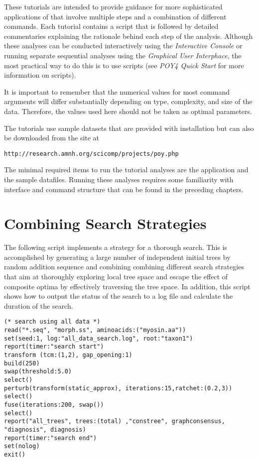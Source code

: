 These tutorials are intended to provide guidance for more sophisticated applications of \poy that involve multiple steps and a combination of different commands. Each tutorial contains a \poy script that is followed by detailed commentaries explaining the rationale behind each step of the analysis. Although these analyses can be conducted interactively using the \emph{Interactive Console} or running separate sequential analyses using the \emph{Graphical User Interphace}, the most practical way to do this is to use \poy scripts (see \emph{ POY4 Quick Start} for more information on \poy scripts).

It is important to remember that the numerical values for most command arguments will differ substantially depending on type, complexity, and size of the data. Therefore, the values used here should not be taken as optimal parameters.

The tutorials use sample datasets that are provided with \poy installation but can also be downloaded from the \poy site at
\begin{center}
\texttt{http://research.amnh.org/scicomp/projects/poy.php}
\end{center}
The minimal required items to run the tutorial analyses are the \poy application and the sample datafiles. Running these analyses requires some familiarity with \poy interface and command structure that can be found in the preceding chapters.

\section{Combining  Search Strategies}{\label{tutorial1}}
The following script implements a strategy for a thorough search. This is accomplished by generating a large number of independent initial trees by random addition sequence and combining combining different search strategies that aim at thoroughly exploring local tree space and escape the effect of composite optima by effectively traversing the tree space. In addition, this script shows how to output the status of the search to a log file and calculate the duration of the search. 

\begin{verbatim}
(* search using all data *)
read("*.seq", "morph.ss", aminoacids:("myosin.aa"))
set(seed:1, log:"all_data_search.log", root:"taxon1")
report(timer:"search start")
transform (tcm:(1,2), gap_opening:1)
build(250)
swap(threshold:5.0)
select()
perturb(transform(static_approx), iterations:15,ratchet:(0.2,3))
select()
fuse(iterations:200, swap())
select()
report("all_trees", trees:(total) ,"constree", graphconsensus,
"diagnosis", diagnosis)
report(timer:"search end")
set(nolog)
exit()
\end{verbatim}

